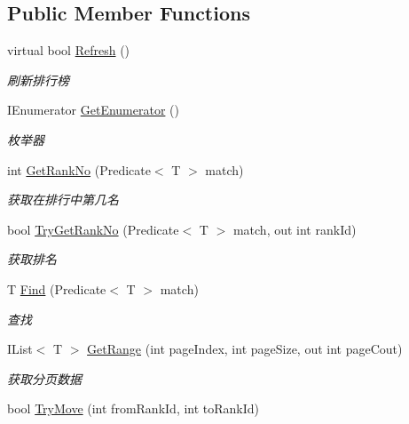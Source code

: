 \subsection*{Public Member Functions}
\begin{DoxyCompactItemize}
\item 
virtual bool \mbox{\hyperlink{class_t_net_1_1_com_1_1_rank_1_1_ranking_a4458c9bb281a9a2401580aca4e7cf28b}{Refresh}} ()
\begin{DoxyCompactList}\small\item\em 刷新排行榜 \end{DoxyCompactList}\item 
I\+Enumerator \mbox{\hyperlink{class_t_net_1_1_com_1_1_rank_1_1_ranking_a0e273e472490b5168b2f4af14304c2ea}{Get\+Enumerator}} ()
\begin{DoxyCompactList}\small\item\em 枚举器 \end{DoxyCompactList}\item 
int \mbox{\hyperlink{class_t_net_1_1_com_1_1_rank_1_1_ranking_a87f2f0e31e3c4ecc18e1b7d8f65c0131}{Get\+Rank\+No}} (Predicate$<$ T $>$ match)
\begin{DoxyCompactList}\small\item\em 获取在排行中第几名 \end{DoxyCompactList}\item 
bool \mbox{\hyperlink{class_t_net_1_1_com_1_1_rank_1_1_ranking_a7fb6e93324626737052a355bf6c79fab}{Try\+Get\+Rank\+No}} (Predicate$<$ T $>$ match, out int rank\+Id)
\begin{DoxyCompactList}\small\item\em 获取排名 \end{DoxyCompactList}\item 
T \mbox{\hyperlink{class_t_net_1_1_com_1_1_rank_1_1_ranking_a4ca04c20afe14ff6cb3b421387151234}{Find}} (Predicate$<$ T $>$ match)
\begin{DoxyCompactList}\small\item\em 查找 \end{DoxyCompactList}\item 
I\+List$<$ T $>$ \mbox{\hyperlink{class_t_net_1_1_com_1_1_rank_1_1_ranking_a403ec872217c9a7fc2d45af230346864}{Get\+Range}} (int page\+Index, int page\+Size, out int page\+Cout)
\begin{DoxyCompactList}\small\item\em 获取分页数据 \end{DoxyCompactList}\item 
bool \mbox{\hyperlink{class_t_net_1_1_com_1_1_rank_1_1_ranking_ad341394025d00b4392735c940300967b}{Try\+Move}} (int from\+Rank\+Id, int to\+Rank\+Id)

\end{DoxyCompactItemize}
